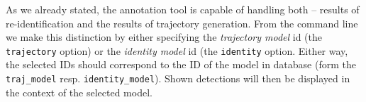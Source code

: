 



As we already stated, the annotation tool is capable of handling both -- results of re-identification and the results of trajectory generation. From the command line we
make this distinction by either specifying the \emph{trajectory model} id (the
\texttt{\-\-trajectory} option) or the \emph{identity model} id (the
\texttt{\-\-identity} option. Either way, the selected IDs should correspond to the
ID of the model in database (form the \texttt{traj\_model} resp. 
\texttt{identity\_model}). Shown detections will then be displayed in the context
of the selected model.

